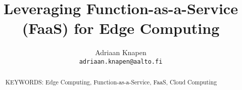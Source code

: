 \documentclass[article]{aaltoseries}
\begin{document}
 

\title{Leveraging Function-as-a-Service (FaaS) for Edge Computing}

\author{Adriaan Knapen%
\\\textnormal{\texttt{adriaan.knapen@aalto.fi}}} %


\maketitle


\begin{abstract}

\vspace{3mm}
\noindent KEYWORDS: Edge Computing, Function-as-a-Service, FaaS, Cloud Computing

\end{abstract}


\end{document}
